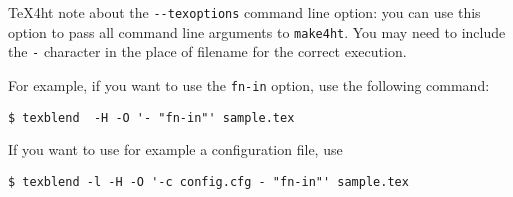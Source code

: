 \TeX4ht note about the \verb|--texoptions| command line option: you can use
this option to pass all command line arguments to \verb|make4ht|. You may need
to include the \verb|-| character in the place of filename for the correct
execution.

For example, if you want to use the \verb|fn-in| option, use the following command:

\begin{verbatim}
$ texblend  -H -O '- "fn-in"' sample.tex
\end{verbatim}

If you want to use for example a configuration file, use

\begin{verbatim}
$ texblend -l -H -O '-c config.cfg - "fn-in"' sample.tex
\end{verbatim}
